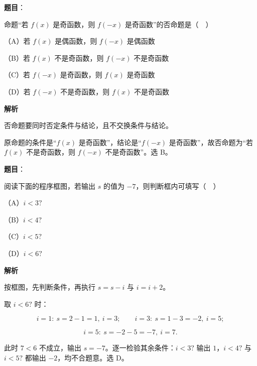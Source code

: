 \begin{answer}

\textbf{题目}：

命题“若 $f(x)$ 是奇函数，则 $f(-x)$ 是奇函数”的否命题是（　）

（A）若 $f(x)$ 是偶函数，则 $f(-x)$ 是偶函数

（B）若 $f(x)$ 不是奇函数，则 $f(-x)$ 不是奇函数

（C）若 $f(-x)$ 是奇函数，则 $f(x)$ 是奇函数

（D）若 $f(-x)$ 不是奇函数，则 $f(x)$ 不是奇函数

\textbf{解析}

否命题要同时否定条件与结论，且不交换条件与结论。

原命题的条件是“$f(x)$ 是奇函数”，结论是“$f(-x)$ 是奇函数”，故否命题为“若 $f(x)$ 不是奇函数，则 $f(-x)$ 不是奇函数”。选 B。


\end{answer}
\begin{answer}

\textbf{题目}：

阅读下面的程序框图，若输出 $s$ 的值为 $-7$，则判断框内可填写（　）
\nopagebreak[4]
\begin{center}\end{center}
\nopagebreak[4]
（A）$i<3?$

（B）$i<4?$

（C）$i<5?$

（D）$i<6?$

\textbf{解析}

按框图，先判断条件，再执行 $s=s-i$ 与 $i=i+2$。

取 $i<6?$ 时：

\nopagebreak[4]
\[i=1:\ s=2-1=1,\ i=3;\qquad i=3:\ s=1-3=-2,\ i=5;\]

\nopagebreak[4]
\[i=5:\ s=-2-5=-7,\ i=7.\]

此时 $7<6$ 不成立，输出 $s=-7$。逐一检验其余条件：$i<3?$ 输出 $1$，$i<4?$ 与 $i<5?$ 都输出 $-2$，均不合题意。选 D。


\end{answer}
